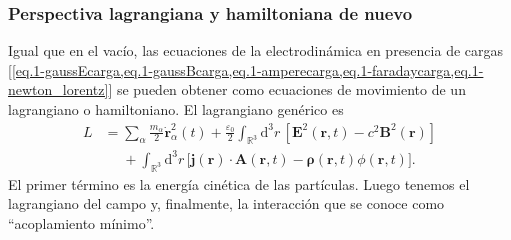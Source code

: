 \subsubsection{Perspectiva lagrangiana y hamiltoniana de nuevo} 
\label{subsubseq.1-lagrangecargas}

Igual que en el vacío, las ecuaciones de la electrodinámica en presencia de cargas [\cref{eq.1-gaussEcarga,eq.1-gaussBcarga,eq.1-amperecarga,eq.1-faradaycarga,eq.1-newton_lorentz}] se pueden obtener como ecuaciones de movimiento de un lagrangiano o hamiltoniano. El lagrangiano genérico es 
\begin{align}
    \nonumber
    L &= \sum_\alpha \frac{m_\alpha}{2}\dot{\mathbf{r}}_\alpha^2(t) + \frac{\varepsilon_0}{2} \int_{\mathbb{R}^3}\mathrm{d}^3r\, \left[\mathbf{E}^2(\mathbf{r}, t) - c^2\mathbf{B}^2(\mathbf{r})\right] \\
    &\phantom{=} + \int_{\mathbb{R}^3}\mathrm{d}^3r\, \big[\mathbf{j}(\mathbf{r})\cdot\mathbf{A}(\mathbf{r}, t) - \mathbf{\rho}(\mathbf{r}, t)\phi(\mathbf{r}, t)\big] .
\end{align}
El primer término es la energía cinética de las partículas. Luego tenemos el lagrangiano del campo y, finalmente, la interacción que se conoce como ``acoplamiento mínimo''. 

